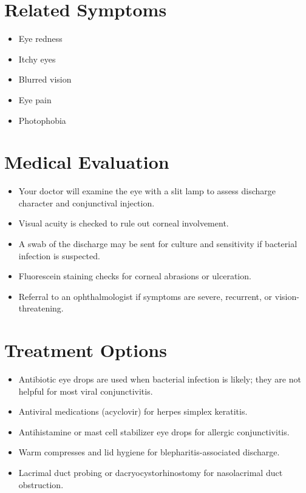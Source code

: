 \section*{Related Symptoms}
\begin{itemize}
  \item Eye redness
  \item Itchy eyes
  \item Blurred vision
  \item Eye pain
  \item Photophobia
\end{itemize}

\section*{Medical Evaluation}
\begin{itemize}
  \item Your doctor will examine the eye with a slit lamp to assess discharge character and conjunctival injection.
  \item Visual acuity is checked to rule out corneal involvement.
  \item A swab of the discharge may be sent for culture and sensitivity if bacterial infection is suspected.
  \item Fluorescein staining checks for corneal abrasions or ulceration.
  \item Referral to an ophthalmologist if symptoms are severe, recurrent, or vision-threatening.
\end{itemize}

\section*{Treatment Options}
\begin{itemize}
  \item Antibiotic eye drops are used when bacterial infection is likely; they are not helpful for most viral conjunctivitis.
  \item Antiviral medications (acyclovir) for herpes simplex keratitis.
  \item Antihistamine or mast cell stabilizer eye drops for allergic conjunctivitis.
  \item Warm compresses and lid hygiene for blepharitis-associated discharge.
  \item Lacrimal duct probing or dacryocystorhinostomy for nasolacrimal duct obstruction.
\end{itemize}


